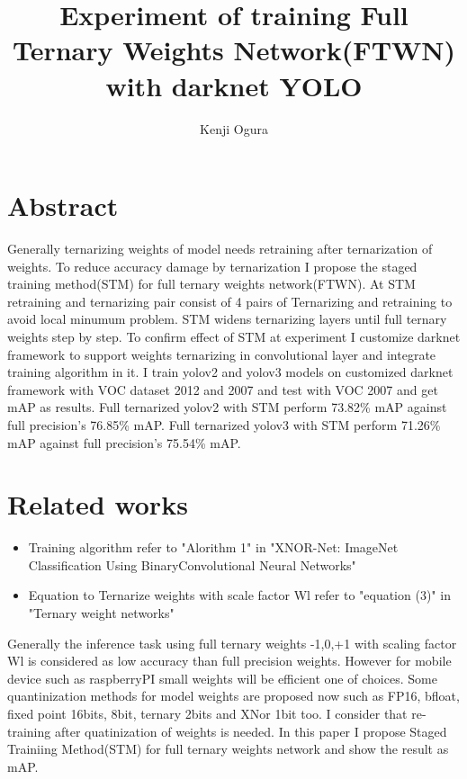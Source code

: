 \documentclass[10pt,a4paper,twocolumn]{article}
\begin{document}
\title{Experiment of training Full Ternary Weights Network(FTWN) with darknet YOLO}
\author{Kenji Ogura}
\date{}
\maketitle

\section{Abstract}
Generally ternarizing weights of model needs retraining after ternarization of weights.
To reduce accuracy damage by ternarization I propose the staged training method(STM) for full ternary weights network(FTWN).
At STM retraining and ternarizing pair consist of 4 pairs of Ternarizing and retraining to avoid local minumum problem.
STM widens ternarizing layers until full ternary weights step by step.
To confirm effect of STM at experiment I customize darknet framework to support weights ternarizing in convolutional layer and integrate training algorithm in it.
I train yolov2 and yolov3 models on customized darknet framework with VOC dataset 2012 and 2007 and test with VOC 2007 and get mAP as results.
Full ternarized yolov2 with STM perform 73.82\% mAP against full precision's 76.85\% mAP.
Full ternarized yolov3 with STM perform 71.26\% mAP against full precision's 75.54\% mAP.

\section{Related works}

\begin{itemize}
\item
 Training algorithm refer to "Alorithm 1" in "XNOR-Net: ImageNet Classification Using BinaryConvolutional Neural Networks"\cite{Rastegari2015XNORNetIC}
\item
 Equation to Ternarize weights with scale factor Wl refer to "equation (3)" in "Ternary weight networks"\cite{Li2016TernaryWN}
\end{itemize}

Generally the inference task using full ternary weights -1,0,+1 with scaling factor Wl is considered as low accuracy than full precision weights.
However for mobile device such as raspberryPI small weights will be efficient one of choices.
Some quantinization methods for model weights are proposed now such as FP16, bfloat, fixed point 16bits, 8bit, ternary 2bits and XNor 1bit too.
I consider that re-training after quatinization of weights is needed.
In this paper I propose Staged Trainiing Method(STM) for full ternary weights network and show the result as mAP.
\end{document}
